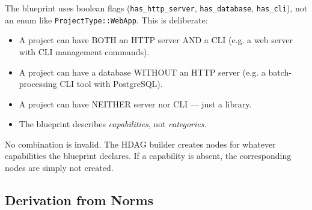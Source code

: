 \documentclass[11pt,a4paper]{article}
\begin{document}
The blueprint uses boolean flags (\texttt{has\_http\_server}, 
\texttt{has\_database}, \texttt{has\_cli}), not an enum like 
\texttt{ProjectType::WebApp}. This is deliberate:

\begin{itemize}[nosep]
\item A project can have BOTH an HTTP server AND a CLI 
      (e.g. a web server with CLI management commands).
\item A project can have a database WITHOUT an HTTP server 
      (e.g. a batch-processing CLI tool with PostgreSQL).
\item A project can have NEITHER server nor CLI --- just a library.
\item The blueprint describes \emph{capabilities}, not \emph{categories}.
\end{itemize}

No combination is invalid. The HDAG builder creates nodes for whatever
capabilities the blueprint declares. If a capability is absent, the
corresponding nodes are simply not created.

\subsection{Derivation from Norms}
\end{document}
